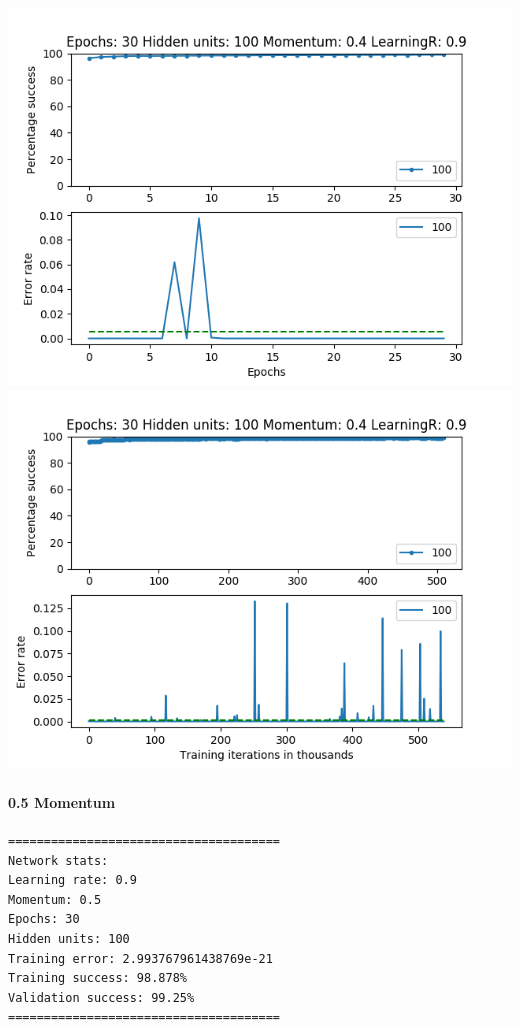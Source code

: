 \documentclass[11pt]{article}
\makeatletter
\def\maxwidth{\ifdim\Gin@nat@width>\linewidth\linewidth
    \else\Gin@nat@width\fi}
\let\Oldincludegraphics\includegraphics
\renewcommand{\includegraphics}[1]{\Oldincludegraphics[width=.8\maxwidth]{#1}}
\makeatother
\begin{document}
\includegraphics{Experiment1/E1_NN_Epoch_Momentum_0.4_30Epochs_100_LR_0.9_Hiddenunits.png}
\includegraphics{Experiment1/E1_NN_Training_Momentum_0.4_30Epochs_100_LR_0.9_Hiddenunits.png}

\hypertarget{momentum-5}{%
\paragraph{0.5 Momentum}\label{momentum-5}}

\begin{verbatim}
======================================
Network stats: 
Learning rate: 0.9
Momentum: 0.5
Epochs: 30
Hidden units: 100
Training error: 2.993767961438769e-21
Training success: 98.878%
Validation success: 99.25%
======================================
\end{verbatim}
\end{document}
